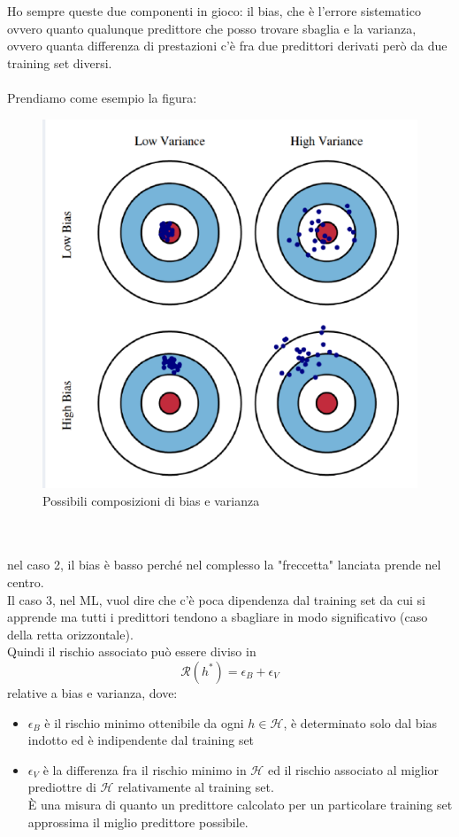 \documentclass[12pt, oneside]{extbook}
\begin{document}
Ho sempre queste due componenti in gioco: il bias, che è l'errore sistematico ovvero quanto qualunque predittore che posso trovare sbaglia e la varianza, ovvero quanta differenza di prestazioni c'è fra due predittori derivati però da due training set diversi.\\\\Prendiamo come esempio la figura:\\
\begin{figure}
	\includegraphics[scale=0.7]{immagini/bias_var.png}
	\caption{Possibili composizioni di bias e varianza}
\end{figure}\\\\
nel caso 2, il bias è basso perché nel complesso la "freccetta" lanciata prende nel centro.\\Il caso 3, nel ML, vuol dire che c'è poca dipendenza dal training set da cui si apprende ma tutti i predittori tendono a sbagliare in modo significativo (caso della retta orizzontale).\\Quindi il rischio associato può essere diviso in 
\begin{equation}
	\mathscr{R}(h^*) = \epsilon_B + \epsilon_V 
\end{equation}
relative a bias e varianza, dove:
\begin{itemize}
	\item $\epsilon_B$ è il rischio minimo ottenibile da ogni $h \in \mathscr{H}$, è determinato solo dal bias indotto ed è indipendente dal training set
	\item $\epsilon_V$ è la differenza fra il rischio minimo in $\mathscr{H}$ ed il rischio associato al miglior prediottre di $\mathscr{H}$ relativamente al training set.\\È una misura di quanto un predittore calcolato per un particolare training set approssima il miglio predittore possibile.
\end{itemize}
\end{document}
